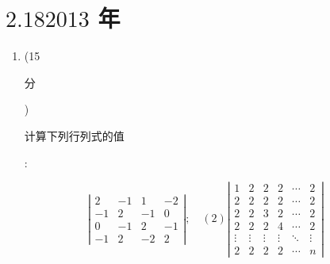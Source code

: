 \documentclass[10pt]{article}
\begin{document}
\section{$2.182013$ 年}
\begin{enumerate}
  \item (15 \begin{CJK}{UTF8}{mj}分\end{CJK}) \begin{CJK}{UTF8}{mj}计算下列行列式的值\end{CJK}:
\end{enumerate}
$$
\left|\begin{array}{cccc}
2 & -1 & 1 & -2 \\
-1 & 2 & -1 & 0 \\
0 & -1 & 2 & -1 \\
-1 & 2 & -2 & 2
\end{array}\right| ; \quad(2)\left|\begin{array}{cccccc}
1 & 2 & 2 & 2 & \cdots & 2 \\
2 & 2 & 2 & 2 & \cdots & 2 \\
2 & 2 & 3 & 2 & \cdots & 2 \\
2 & 2 & 2 & 4 & \cdots & 2 \\
\vdots & \vdots & \vdots & \vdots & \ddots & \vdots \\
2 & 2 & 2 & 2 & \cdots & n
\end{array}\right|
$$
\end{document}
